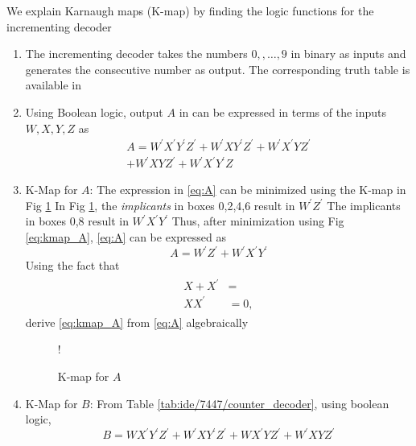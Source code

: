 We explain Karnaugh maps (K-map) by finding the
logic functions for the incrementing decoder

\begin{enumerate}[label=\arabic*.,ref=\theenumi]
%
	\item The incrementing decoder   takes the numbers $0,,\dots,9$ in binary as inputs and generates
the consecutive number as output.  The corresponding truth table is available in 
%

%
\item Using Boolean logic, output $A$  in  can be expressed in terms of the inputs $W,X,Y,Z$ as
\begin{multline}
\label{eq:A}
A = W^{\prime}X^{\prime}Y^{\prime}Z^{\prime} + W^{\prime}XY^{\prime}Z^{\prime}
+W^{\prime}X^{\prime}YZ^{\prime}
\\
+W^{\prime}XYZ^{\prime}
+W^{\prime}X^{\prime}Y^{\prime}Z
\end{multline}
\item K-Map for $A$: 
The expression in \eqref{eq:A}  can be minimized using the K-map in Fig \ref{fig:kmap_A}
In Fig \ref{fig:kmap_A},  the {\em implicants} in boxes 0,2,4,6 result in $W^{\prime}Z^{\prime}$  The implicants in
boxes 0,8 result in $W^{\prime}X^{\prime}Y^{\prime}$  Thus, after minimization using Fig \ref{eq:kmap_A},  \eqref{eq:A} can be expressed as
%
\begin{equation}
\label{eq:kmap_A}
A = W^{\prime}Z^{\prime}+W^{\prime}X^{\prime}Y^{\prime}
\end{equation}
%
Using the fact that
\begin{align}
\label{eq:boolean}
\begin{split}
X+X^{\prime} &= 
\\
XX^{\prime} &= 0,
\end{split}
\end{align}
%
derive \eqref{eq:kmap_A} from \eqref{eq:A} algebraically
%
%
%
\begin{figure}[H]
\resizebox {\columnwidth} {!} {

}
\caption{K-map for $A$}
\label{fig:kmap_A}
\end{figure}
%
\item K-Map for $B$:
From Table \ref{tab:ide/7447/counter_decoder}, using boolean logic,
\begin{equation}
\label{eq:B}
B = WX^{\prime}Y^{\prime}Z^{\prime} + W^{\prime}XY^{\prime}Z^{\prime}
+WX^{\prime}YZ^{\prime}
+W^{\prime}XYZ^{\prime}

\end{equation}
\end{enumerate}
